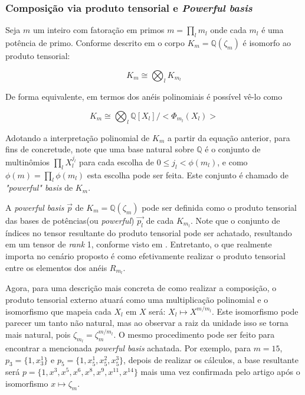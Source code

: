 \subsubsection{Composição via produto tensorial e \textit{Powerful basis}}
Seja $m$ um inteiro com fatoração em primos $m = \prod_{l} m_l$ onde cada $m_l$ é uma potência de primo. Conforme descrito em \cite{lyubashevsky2013}
o corpo $K_m = \mathbb{Q}(\zeta_m)$ é isomorfo ao produto tensorial: 

\begin{equation}
    K_m \cong \bigotimes_l K_{m_l}
\end{equation}

De forma equivalente, em termos dos anéis polinomiais é possível vê-lo como

\begin{equation}
    K_m \cong \bigotimes_l \mathbb{Q}[X_l] / <\Phi_{m_l}(X_l)> 
\end{equation}

Adotando a interpretação polinomial de $K_m$ a partir da equação anterior, para fins de concretude, note que uma base natural sobre $\mathbb{Q}$ é o conjunto 
de multinômios $\prod_l X_l^{j_l}$ para cada escolha de $0 \le j_l < \phi(m_l)$, e como $\phi(m) = \prod_l \phi(m_l)$ esta escolha pode ser feita.
Este conjunto é chamado de \textit{"powerful" basis} de $K_m$.

A \textit{powerful basis} $\vec{p}$ de $K_m = \mathbb{Q}(\zeta_m)$ pode ser definida como o produto tensorial das bases de potências(ou \textit{powerful}) $\vec{p_l}$ de cada $K_{m_l}$. Note
que o conjunto de índices no tensor resultante do produto tensorial pode ser achatado, resultando em um tensor de \textit{rank} 1, conforme visto em \cite{lyubashevsky2013}.
Entretanto, o que realmente importa no cenário proposto é como efetivamente realizar o produto tensorial entre os elementos dos anéis $R_{m_l}$.

Agora, para uma descrição mais concreta de como realizar a composição, o produto tensorial externo atuará como uma multiplicação polinomial 
e o isomorfismo que mapeia cada $X_l$ em $X$ será: $X_l \mapsto X^{m/m_l}$. Este isomorfismo pode parecer um tanto não natural, mas ao observar a raiz
da unidade isso se torna mais natural, pois $\zeta_{m_l} = \zeta_m^{m/m_l}$. O mesmo procedimento pode ser feito para encontrar a mencionada
\textit{powerful basis} achatada. Por exemplo, para $m = 15$, $p_3 = \{1,x_{3}^1\}$ e $p_5 = \{1,x_{5}^1, x_{5}^2, x_{5}^3\}$,
depois de realizar os cálculos, a base resultante será $p = \{1, x^3, x^5, x^6, x^8, x^9, x^{11}, x^{14}\}$ mais uma vez confirmada pelo artigo \cite{lyubashevsky2013} após o isomorfismo $x \mapsto \zeta_m$. 

